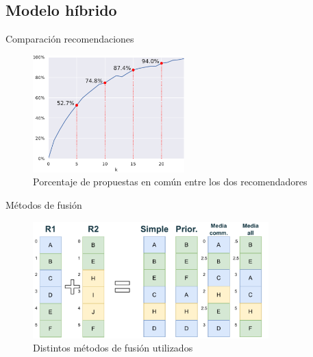 \subsection{Modelo híbrido}
\begin{frame}{Comparación recomendaciones}
    \begin{figure}
        \centering
        \includegraphics[height=45mm]{./images/graphs/12_hybrid_common_Decentraland_W-THU_normalize=True.pdf}
        \caption{Porcentaje de propuestas en común entre los dos recomendadores}
    \end{figure}
\end{frame}    

\begin{frame}{Métodos de fusión}
    \begin{figure}
        \centering
        \includegraphics[height=45mm]{./images/diagrams/metodos-fusion.drawio.pdf}
        \caption{Distintos métodos de fusión utilizados}
    \end{figure}
\end{frame}
